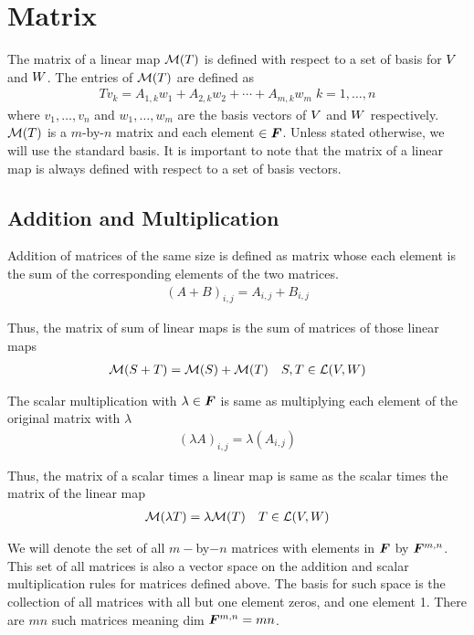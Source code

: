 \documentclass[../../linear_algebra.tex]{subfiles}
\begin{document}
\section{Matrix}
The matrix of a linear map $\mathcal{M}(T)$ is defined with respect to a set of basis for $V$ and $W$. The entries of $\mathcal{M}(T)$ are defined as
\begin{align*}
    Tv_{k} = A_{1,k}w_{1} + A_{2,k}w_{2} + \cdots + A_{m,k}w_{m} \; k=1,\ldots, n
\end{align*}
where $v_{1}, \ldots, v_{n}$ and $w_{1}, \ldots, w_{m}$ are the basis vectors of $V$ and $W$ respectively. $\mathcal{M}(T)$ is a $m$-by-$n$ matrix and each element $\in \bm{F}$. Unless stated otherwise, we will use the standard basis.\newline
It is important to note that the matrix of a linear map is always defined with respect to a set of basis vectors.


\subsection{Addition and Multiplication}
Addition of matrices of the same size is defined as matrix whose each element is the sum of the corresponding elements of the two matrices.
\begin{align*}
    (A+B)_{i,j} = A_{i,j} + B_{i,j}
\end{align*}

Thus, the matrix of sum of linear maps is the sum of matrices of those linear maps
\begin{align*}
    \mathcal{M}(S + T) = \mathcal{M}(S) + \mathcal{M}(T) \quad S, T \in \mathcal{L}(V, W)
\end{align*}

The scalar multiplication with $\lambda \in \bm{F}$ is same as multiplying each element of the original matrix with $\lambda$
\begin{align*}
    (\lambda A)_{i,j} = \lambda (A_{i,j})     
\end{align*}

Thus, the matrix of a scalar times a linear map is same as the scalar times the matrix of the linear map
\begin{align*}
    \mathcal{M}(\lambda T) = \lambda \mathcal{M}(T) \quad T \in \mathcal{L}(V, W)
\end{align*}

We will denote the set of all $m-$by$-n$ matrices with elements in $\bm{F}$ by $\bm{F}^{m,n}$. This set of all matrices is also a vector space on the addition and scalar multiplication rules for matrices defined above. The basis for such space is the collection of all matrices with all but one element zeros, and one element 1. There are $mn$ such matrices meaning dim $\bm{F}^{m,n} = mn$.
\end{document}
